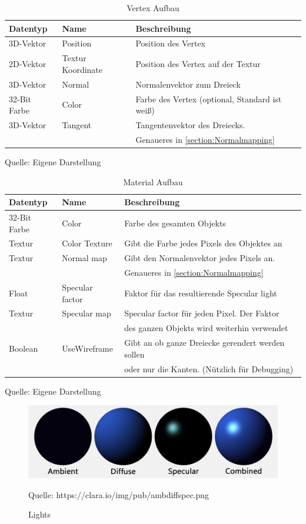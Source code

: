 \begin{table}
	\caption{Vertex Aufbau}
	\label{table:VertexAufbau}
	\centering
	\begin{tabular}{lll}\toprule[1.5pt]
		Datentyp & Name & Beschreibung \\\midrule
		3D-Vektor & Position & Position des Vertex \\
		2D-Vektor & Textur Koordinate & Position des Vertex auf der Textur \\
		3D-Vektor & Normal & Normalenvektor zum Dreieck \\
		32-Bit Farbe & Color & Farbe des Vertex (optional, Standard ist weiß) \\
		3D-Vektor & Tangent & Tangentenvektor des Dreiecks. \\
		 & & Genaueres in \cref{section:Normalmapping}\\\bottomrule[1.5pt]
	\end{tabular}
	Quelle: Eigene Darstellung
\end{table}
\begin{table}
	\caption{Material Aufbau}
	\centering
	\begin{tabular}{lll}\toprule[1.5pt]
	Datentyp & Name & Beschreibung \\\midrule
	32-Bit Farbe & Color & Farbe des gesamten Objekts \\
	Textur & Color Texture & Gibt die Farbe jedes Pixels des Objektes an \\
	Textur & Normal map & Gibt den Normalenvektor jedes Pixels an. \\
	 & & Genaueres in \cref{section:Normalmapping} \\
	Float & Specular factor & Faktor für das resultierende Specular light \\
	Textur & Specular map & Specular factor für jeden Pixel. Der Faktor \\
	 & & des ganzen Objekts wird weiterhin verwendet \\
	 Boolean & UseWireframe & Gibt an ob ganze Dreiecke gerendert werden sollen\\
	  & & oder nur die Kanten. (Nützlich für Debugging)\\\bottomrule[1.5pt]
\end{tabular}
	Quelle: Eigene Darstellung
\end{table}

\begin{figure}
	\centering
	\includegraphics[scale=0.4]{02theorie/amb_diff_spec.png}
		
	Quelle: https://clara.io/img/pub/amb\textunderscore diff\textunderscore spec.png
	\caption{Lights}\label{Img:Lights}
\end{figure}

